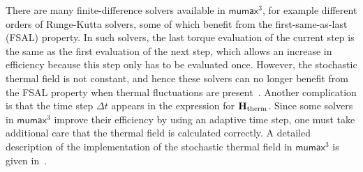 \documentclass[11pt,a4paper,english]{article}
\newcommand{\mumax}{$\mathsf{mumax}^3$}
\begin{document}
There are many finite-difference solvers available in \mumax{}, for example different orders of Runge-Kutta solvers, some of which benefit from the first-same-as-last (FSAL) property. In such solvers, the last torque evaluation of the current step is the same as the first evaluation of the next step, which allows an increase in efficiency because this step only has to be evaluated once. However, the stochastic thermal field is not constant, and hence these solvers can no longer benefit from the FSAL property when thermal fluctuations are present~\cite{LEL-17b}. Another complication is that the time step $\Delta t$ appears in the expression for $\vb{H_\mathrm{therm}}$. Since some solvers in \mumax{} improve their efficiency by using an adaptive time step, one must take additional care that the thermal field is calculated correctly. A detailed description of the implementation of the stochastic thermal field in \mumax{} is given in~\cite{LEL-17b}.

\clearpage
\end{document}
